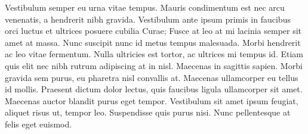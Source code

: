 \documentclass{article}
\begin{document}
Vestibulum semper eu urna vitae tempus. Mauris condimentum est nec arcu venenatis, a hendrerit nibh gravida. Vestibulum ante ipsum primis in faucibus orci luctus et ultrices posuere cubilia Curae; Fusce at leo at mi lacinia semper sit amet at massa. Nunc suscipit nunc id metus tempus malesuada. Morbi hendrerit ac leo vitae fermentum. Nulla ultricies est tortor, ac ultrices mi tempus id. Etiam quis elit nec nibh rutrum adipiscing at in nisl. Maecenas in sagittis sapien. Morbi gravida sem purus, eu pharetra nisl convallis at. Maecenas ullamcorper eu tellus id mollis. Praesent dictum dolor lectus, quis faucibus ligula ullamcorper sit amet. Maecenas auctor blandit purus eget tempor. Vestibulum sit amet ipsum feugiat, aliquet risus ut, tempor leo. Suspendisse quis purus nisi. Nunc pellentesque at felis eget euismod.

% 
% 
\end{document}
